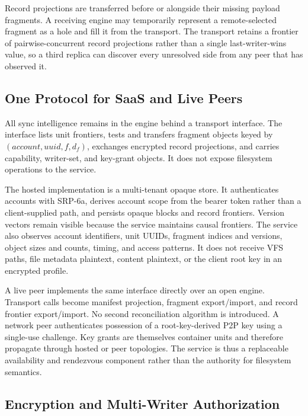 Record projections are transferred before or alongside their missing payload
fragments.  A receiving engine may temporarily represent a remote-selected
fragment as a hole and fill it from the transport.  The transport retains a
frontier of pairwise-concurrent record projections rather than a single
last-writer-wins value, so a third replica can discover every unresolved side
from any peer that has observed it.

\subsection{One Protocol for SaaS and Live Peers}
\label{subsec:transport}

All sync intelligence remains in the engine behind a transport interface.  The
interface lists unit frontiers, tests and transfers fragment objects keyed by
$(\mathit{account},\mathit{uuid},f,d_f)$, exchanges encrypted record
projections, and carries capability, writer-set, and key-grant objects.  It does
not expose filesystem operations to the service.

The hosted implementation is a multi-tenant opaque store.  It authenticates
accounts with SRP-6a, derives account scope from the bearer token rather than a
client-supplied path, and persists opaque blocks and record frontiers.  Version
vectors remain visible because the service maintains causal frontiers.  The
service also observes account identifiers, unit UUIDs, fragment indices and
versions, object sizes and counts, timing, and access patterns.  It does not
receive VFS paths, file metadata plaintext, content plaintext, or the client
root key in an encrypted profile.

A live peer implements the same interface directly over an open \sfs{} engine.
Transport calls become manifest projection, fragment export/import, and record
frontier export/import.  No second reconciliation algorithm is introduced.  A
network peer authenticates possession of a root-key-derived P2P key using a
single-use challenge.  Key grants are themselves container units and therefore
propagate through hosted or peer topologies.  The service is thus a replaceable
availability and rendezvous component rather than the authority for filesystem
semantics.

\subsection{Encryption and Multi-Writer Authorization}
\label{subsec:crypto}
\label{subsec:multiwriter}

